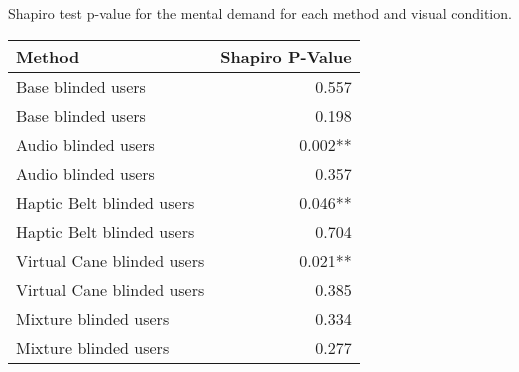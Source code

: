 
\centering
\caption{Shapiro test p-value for the mental demand for each method and visual condition.}
\label{tab:shapiro_mental_demand}
\begin{tabular}{lr}
\toprule
                    Method & Shapiro P-Value \\
\midrule
        Base blinded users &           0.557 \\
        Base blinded users &           0.198 \\
       Audio blinded users &         0.002** \\
       Audio blinded users &           0.357 \\
 Haptic Belt blinded users &         0.046** \\
 Haptic Belt blinded users &           0.704 \\
Virtual Cane blinded users &         0.021** \\
Virtual Cane blinded users &           0.385 \\
     Mixture blinded users &           0.334 \\
     Mixture blinded users &           0.277 \\
\bottomrule
\end{tabular}
